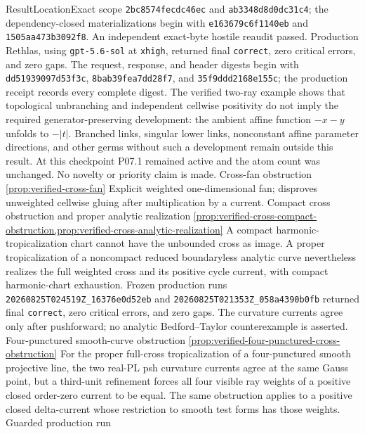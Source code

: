 \begin{AppLProvenanceLedger}{Result}{Location}{Exact scope}
{   \texttt{2bc8574fecdc46ec} and \texttt{ab3348d8d0dc31c4}; the
   dependency-closed materializations begin with
   \texttt{e163679c6f1140eb} and \texttt{1505aa473b3092f8}.
   An independent exact-byte hostile reaudit passed.  Production Rethlas,
   using \texttt{gpt-5.6-sol} at \texttt{xhigh}, returned final
   \texttt{correct}, zero critical errors, and zero gaps.  The request,
   response, and header digests begin with \texttt{dd51939097d53f3c},
   \texttt{8bab39fea7dd28f7}, and \texttt{35f9ddd2168e155c}; the production
   receipt records every complete digest.  The verified two-ray example
   shows that topological unbranching and independent cellwise positivity
   do not imply the required generator-preserving development: the ambient
   affine function \(-x-y\) unfolds to \(-|t|\).  Branched links, singular
   lower links, nonconstant affine parameter directions, and other germs
   without such a development remain outside this result. At this checkpoint
   P07.1 remained active and the atom count was unchanged. No novelty or
   priority claim is made.}
\AppLProvenanceRecord
  {Cross-fan obstruction}
  {\cref{prop:verified-cross-fan}}
  {Explicit weighted one-dimensional fan; disproves unweighted cellwise
   gluing after multiplication by a current.}
\AppLProvenanceRecord
  {Compact cross obstruction and proper analytic realization}
  {\cref{prop:verified-cross-compact-obstruction,prop:verified-cross-analytic-realization}}
  {A compact harmonic-tropicalization chart cannot have the unbounded cross
   as image.  A proper tropicalization of a noncompact reduced boundaryless
   analytic curve nevertheless realizes the full weighted cross and its
   positive cycle current, with compact harmonic-chart exhaustion.  Frozen
   production runs
   \nolinkurl{20260825T024519Z_16376e0d52eb} and
   \nolinkurl{20260825T021353Z_058a4390b0fb} returned final
   \texttt{correct}, zero critical errors, and zero gaps.  The curvature
   currents agree only after pushforward; no analytic Bedford--Taylor
   counterexample is asserted.}
\AppLProvenanceRecord
  {Four-punctured smooth-curve obstruction}
  {\cref{prop:verified-four-punctured-cross-obstruction}}
  {For the proper full-cross tropicalization of a four-punctured smooth
   projective line, the two real-PL psh curvature currents agree at the same
   Gauss point, but a third-unit refinement forces all four visible ray
   weights of a positive closed order-zero current to be equal.  The same
   obstruction applies to a positive closed delta-current whose restriction
   to smooth test forms has those weights.  Guarded production run
}
\end{AppLProvenanceLedger}
